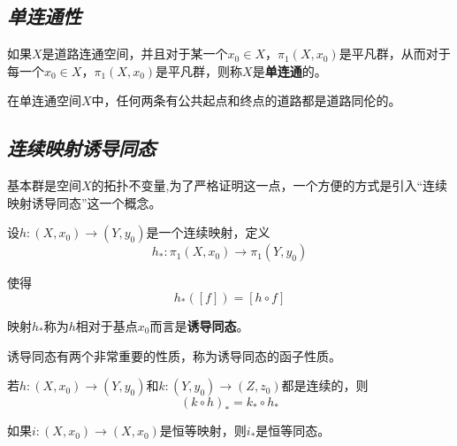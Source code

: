 \subsection*{\textsl{单连通性}}

\vspace*{1em}

\begin{define}
    如果$X$是道路连通空间，并且对于某一个$x_0\in X$，$\pi_1(X,x_0)$是平凡群，从而对于每一个$x_0\in X$，$\pi_1(X,x_0)$是平凡群，则称$X$是\textbf{单连通}的。
\end{define}

\vspace*{1em}

\begin{mdframed}
    \begin{lemma}
        在单连通空间$X$中，任何两条有公共起点和终点的道路都是道路同伦的。
    \end{lemma}
\end{mdframed}


\subsection*{\textsl{连续映射诱导同态}}

基本群是空间$X$的拓扑不变量,为了严格证明这一点，一个方便的方式是引入“连续映射诱导同态”这一个概念。

\vspace*{1em}

\begin{define}
    设$h:(X,x_0)\rightarrow (Y,y_0)$是一个连续映射，定义
    \begin{equation}
        h_*:\pi_1(X,x_0)\rightarrow \pi_1(Y,y_0)
    \end{equation}

    使得
    \begin{equation}
        h_*([f])=[h\circ f]
    \end{equation}

    映射$h_*$称为$h$相对于基点$x_0$而言是\textbf{诱导同态}。
\end{define}

\vspace*{1em}

诱导同态有两个非常重要的性质，称为诱导同态的函子性质。
\begin{mdframed}
    \begin{theorem}
        若$h:(X,x_0)\rightarrow (Y,y_0)$和$k:(Y,y_0)\rightarrow (Z,z_0)$都是连续的，则
        \begin{equation}
            (k\circ h)_*=k_*\circ h_*
        \end{equation}

        如果$i:(X,x_0)\rightarrow (X,x_0)$是恒等映射，则$i_*$是恒等同态。
    \end{theorem}
\end{mdframed}

